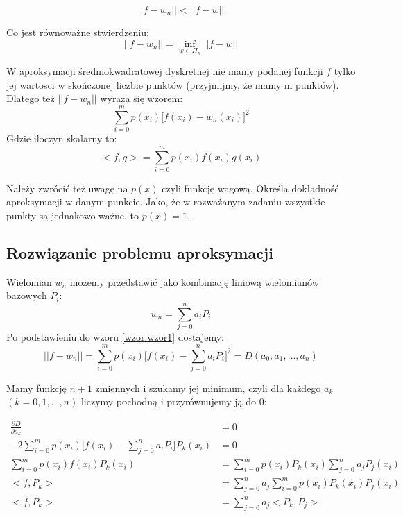 \documentclass[11pt]{article}
\begin{document}
\begin{equation*}
||f - w_n || < ||f - w||
\end{equation*}

Co jest równoważne stwierdzeniu:
\begin{equation*}
||f - w_n || = \inf_{w \in \Pi_n} ||f - w||
\end{equation*}

W aproksymacji średniokwadratowej dyskretnej nie mamy podanej funkcji $f$ tylko jej wartosci w skończonej liczbie punktów (przyjmijmy, że mamy m punktów). Dlatego też $||f - w_n ||$ wyraża się wzorem:
\begin{equation}
\sum_{i=0}^m p(x_i) \Big[f(x_i) - w_n(x_i)\Big]^2
\label{wzor:wzor1}
\end{equation}
Gdzie iloczyn skalarny to:
\begin{equation}
<f,g> = \sum_{i=0}^m p(x_i) f(x_i) g(x_i)
\label{wzor:wzor2}
\end{equation}

Należy zwrócić też uwagę na $p(x)$ czyli funkcję wagową. Określa dokładność aproksymacji w danym punkcie. Jako, że w rozważanym zadaniu wszystkie punkty są jednakowo ważne, to $p(x) = 1$.

\subsection{Rozwiązanie problemu aproksymacji}
Wielomian $w_n$ możemy przedstawić jako kombinację liniową wielomianów bazowych $P_i$: 
\begin{equation*}
w_n = \sum_{j = 0}^n a_i P_i
\end{equation*}
Po podstawieniu do wzoru \ref{wzor:wzor1} dostajemy:
\begin{equation}
||f - w_n|| = \sum_{i=0}^m p(x_i) \Big[f(x_i) - \sum_{j = 0}^n a_i P_i\Big]^2 = D(a_0, a_1, \dots , a_n) 
\end{equation}

Mamy funkcję $n+1$ zmiennych i szukamy jej minimum, czyli dla każdego $a_k$ $(k = 0,1, \dots , n)$ liczymy pochodną i przyrównujemy ją do $0$:

\begin{align*}
\frac{\partial D}{\partial a_k} &= 0 \\
-2 \sum_{i=0}^m p(x_i) \Big[f(x_i) - \sum_{j = 0}^n a_i P_i\Big]P_k(x_i) &= 0\\
\sum_{i=0}^m p(x_i)f(x_i)P_k(x_i) &= \sum_{i=0}^m p(x_i)P_k(x_i) \sum_{j = 0}^n a_j P_j(x_i)\\
<f,P_k> &= \sum_{j = 0}^n a_j \sum_{i=0}^m p(x_i)P_k(x_i)P_j(x_i) \\
<f,P_k> &= \sum_{j = 0}^n a_j <P_k, P_j>
\end{align*}
\end{document}

